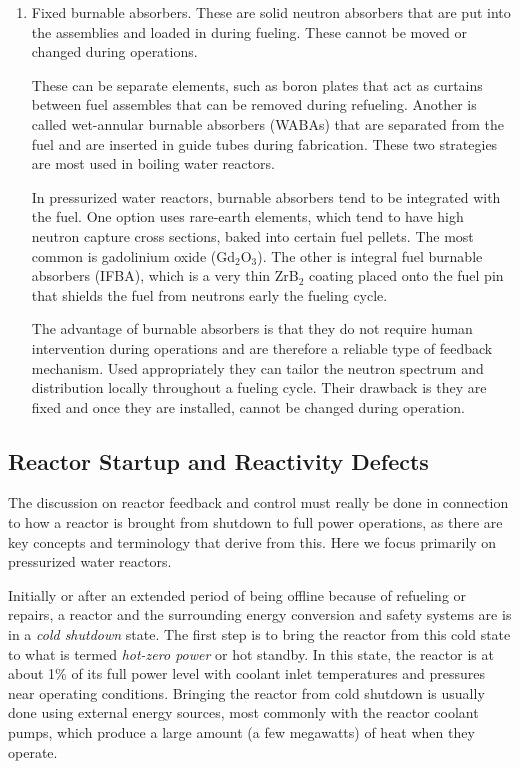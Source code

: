 \begin{enumerate}
  \item Fixed burnable absorbers. These are solid neutron absorbers that are put into the assemblies and loaded in during fueling. These cannot be moved or changed during operations. 
  
  These can be separate elements, such as boron plates that act as curtains between fuel assembles that can be removed during refueling. Another is called wet-annular burnable absorbers (WABAs) that are separated from the fuel and are inserted in guide tubes during fabrication. These two strategies are most used in boiling water reactors.
  
  In pressurized water reactors, burnable absorbers tend to be integrated with the fuel. One option uses rare-earth elements, which tend to have high neutron capture cross sections, baked into certain fuel pellets. The most common is gadolinium oxide (Gd$_2$O$_3$). The other is integral fuel burnable absorbers (IFBA), which is a very thin ZrB$_2$ coating placed onto the fuel pin that shields the fuel from neutrons early the fueling cycle.
  
  The advantage of burnable absorbers is that they do not require human intervention during operations and are therefore a reliable type of feedback mechanism. Used appropriately they can tailor the neutron spectrum and distribution locally throughout a fueling cycle. Their drawback is they are fixed and once they are installed, cannot be changed during operation.
\end{enumerate}

\subsection{Reactor Startup and Reactivity Defects}

The discussion on reactor feedback and control must really be done in connection to how a reactor is brought from shutdown to full power operations, as there are key concepts and terminology that derive from this. Here we focus primarily on pressurized water reactors.

Initially or after an extended period of being offline because of refueling or repairs, a reactor and the surrounding energy conversion and safety systems are is in a \emph{cold shutdown} state. The first step is to bring the reactor from this cold state to what is termed \emph{hot-zero power} or hot standby. In this state, the reactor is at about 1\% of its full power level with coolant inlet temperatures and pressures near operating conditions. Bringing the reactor from cold shutdown is usually done using external energy sources, most commonly with the reactor coolant pumps, which produce a large amount (a few megawatts) of heat when they operate.


